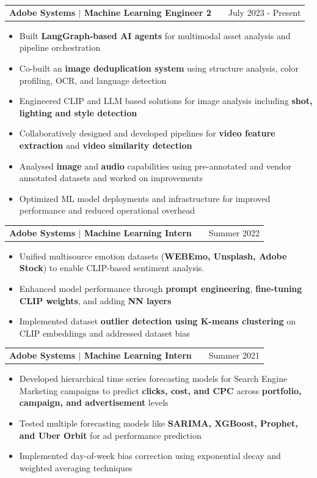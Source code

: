 \documentclass[a4paper,10pt]{article}
\makeatletter
\newenvironment{joblong}[2]
    {
    \begin{tabularx}{\linewidth}{@{}l X r@{}}
    \textbf{#1} & \hfill &  #2 \\[3.75pt]
    \end{tabularx}
    \begin{minipage}[t]{\linewidth}
    \begin{itemize}[nosep,after=\strut, leftmargin=1em, itemsep=3pt,label=--]
    }
    {
    \end{itemize}
    \end{minipage}
    }
\makeatother
\begin{document}
\begin{joblong}{{\color{adobeblue}Adobe Systems} $|$ Machine Learning Engineer 2}{July 2023 - Present}
\item Built \textbf{LangGraph-based AI agents} for multimodal asset analysis and pipeline orchestration
\item Co-built an \textbf{image deduplication system} using structure analysis, color profiling, OCR, and language detection
\item Engineered CLIP and LLM based solutions for image analysis including \textbf{shot, lighting and style detection}
\item Collaboratively designed and developed pipelines for \textbf{video feature extraction} and \textbf{video similarity detection}
\item Analysed \textbf{image} and \textbf{audio} capabilities using pre-annotated and vendor annotated datasets and worked on improvements
\item Optimized ML model deployments and infrastructure for improved performance and reduced operational overhead
\end{joblong}

\begin{joblong}{{\color{adobeblue}Adobe Systems} $|$ Machine Learning Intern}{Summer 2022}
\item Unified multisource emotion datasets (\textbf{WEBEmo, Unsplash, Adobe Stock}) to enable CLIP-based sentiment analysis.
\item Enhanced model performance through \textbf{prompt engineering}, \textbf{fine-tuning CLIP weights}, and adding \textbf{NN layers}
\item Implemented dataset \textbf{outlier detection using K-means clustering} on CLIP embeddings and addressed dataset bias
\end{joblong}

\begin{joblong}{{\color{adobeblue}Adobe Systems} $|$ Machine Learning Intern}{Summer 2021}
\item Developed hierarchical time series forecasting models for Search Engine Marketing campaigns to predict \textbf{clicks, cost, and CPC} across \textbf{portfolio, campaign, and advertisement} levels
\item Tested multiple forecasting models like \textbf{SARIMA, XGBoost, Prophet, and Uber Orbit} for ad performance prediction
\item Implemented day-of-week bias correction using exponential decay and weighted averaging techniques
\end{joblong}
\end{document}
